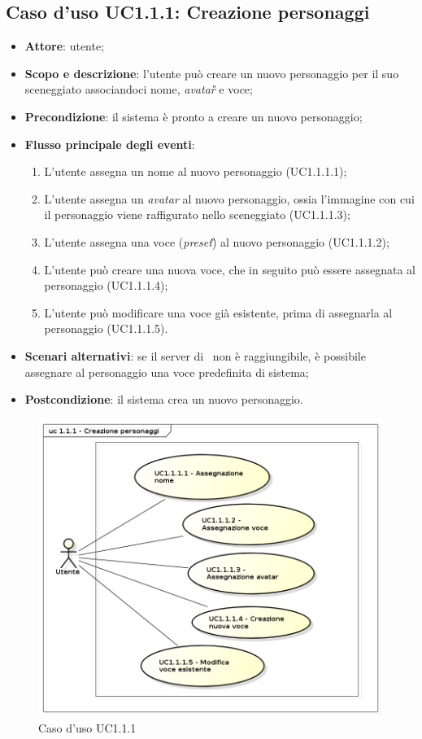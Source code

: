 \subsection{Caso d'uso UC1.1.1: Creazione personaggi}
\label{sec:UC1.1.1}

\begin{itemize}
\item \textbf{Attore}: utente;
\item \textbf{Scopo e descrizione}: l'utente può creare un nuovo personaggio per il suo sceneggiato associandoci nome, \textit{avatar\G} e voce;
\item \textbf{Precondizione}: il sistema è pronto a creare un nuovo personaggio;
\item \textbf{Flusso principale degli eventi}:
\begin{enumerate}
\item L'utente assegna un nome al nuovo personaggio (UC1.1.1.1);
\item L'utente assegna un \textit{avatar} al nuovo personaggio, ossia l'immagine con cui il personaggio viene raffigurato nello sceneggiato (UC1.1.1.3);
\item L'utente assegna una voce (\textit{preset}\G) al nuovo personaggio (UC1.1.1.2);
\item L'utente può creare una nuova voce, che in seguito può essere assegnata al personaggio (UC1.1.1.4);
\item L'utente può modificare una voce già esistente, prima di assegnarla al personaggio (UC1.1.1.5).
\end{enumerate} 
\item \textbf{Scenari alternativi}: se il server di \AZIENDA\ non è raggiungibile, è possibile assegnare al personaggio una voce predefinita di sistema;
\item \textbf{Postcondizione}: il sistema crea un nuovo personaggio.
\end{itemize}

\begin{figure}[htbp]
\centering
\includegraphics[scale=0.5]{immagini/uc1_1_1_creazione_personaggi.png}
\captionsetup{labelfont=bf}
\caption{Caso d'uso UC1.1.1}
\end{figure}
\newpage

